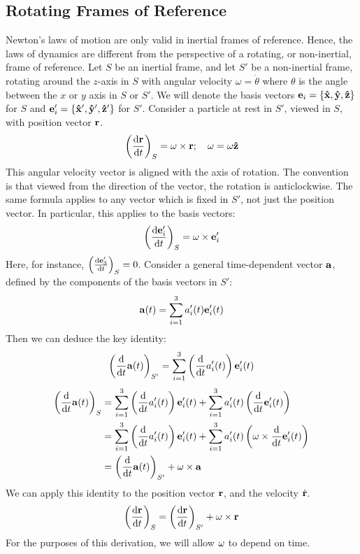 \subsection{Rotating Frames of Reference}
Newton's laws of motion are only valid in inertial frames of reference.
Hence, the laws of dynamics are different from the perspective of a rotating, or non-inertial, frame of reference.
Let \(S\) be an inertial frame, and let \(S'\) be a non-inertial frame, rotating around the \(z\)-axis in \(S\) with angular velocity \(\omega = \dot\theta\) where \(\theta\) is the angle between the \(x\) or \(y\) axis in \(S\) or \(S'\).
We will denote the basis vectors \(\vb e_i = \{ \vu{x}, \vu{y}, \vu{z} \}\) for \(S\) and \(\vb e'_i = \{ \vu{x}', \vu{y}', \vu{z}' \}\) for \(S'\).
Consider a particle at rest in \(S'\), viewed in \(S\), with position vector \(\vb r\).
\[
	\left( \dv{\vb r}{t} \right)_S = \vb\omega \times \vb r;\quad \vb\omega = \omega\vu{z}
\]
This angular velocity vector is aligned with the axis of rotation.
The convention is that viewed from the direction of the vector, the rotation is anticlockwise.
The same formula applies to any vector which is fixed in \(S'\), not just the position vector.
In particular, this applies to the basis vectors:
\[
	\left( \dv{\vb e_i'}{t} \right)_S = \vb\omega \times \vb e_i'
\]
Here, for instance, \(\left( \dv{\vb e_3'}{t} \right)_S = 0\).
Consider a general time-dependent vector \(\vb a\), defined by the components of the basis vectors in \(S'\):
\[
	\vb a(t) = \sum_{i=1}^3 a_i'(t)\vb e'_i(t)
\]
Then we can deduce the key identity:
\[
	\left( \dv{t} \vb a(t) \right)_{S'} = \sum_{i=1}^3\left( \dv{t} a_i'(t)  \right) \vb e'_i(t)
\]
\begin{align*}
	\left( \dv{t} \vb a(t) \right)_{S} & = \sum_{i=1}^3\left( \dv{t} a_i'(t) \right) \vb e'_i(t) + \sum_{i=1}^3 a'_i(t) \left( \dv{t} \vb e_i'(t) \right)                   \\
	                                   & = \sum_{i=1}^3\left( \dv{t} a_i'(t) \right) \vb e'_i(t) + \sum_{i=1}^3 a'_i(t) \left( \vb\omega \times \dv{t} \vb  e_i'(t) \right) \\
	                                   & = \left( \dv{t} \vb a(t) \right)_{S'} + \vb\omega \times \vb a
\end{align*}
We can apply this identity to the position vector \(\vb r\), and the velocity \(\dot{\vb{r}}\).
\[
	\left( \dv{\vb r}{t} \right)_S = \left( \dv{\vb r}{t} \right)_{S'} + \vb\omega \times \vb r
\]
For the purposes of this derivation, we will allow \(\vb\omega\) to depend on time.
